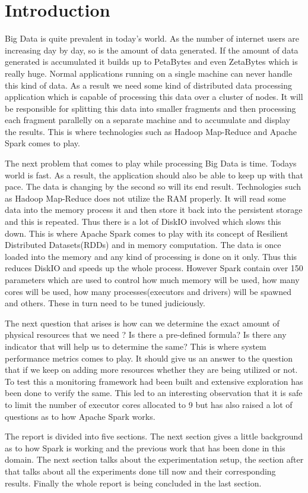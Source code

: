 \documentclass[11pt]{article}
\begin{document}
\section{Introduction}
Big Data is quite prevalent in today's world. As the number of internet users are increasing day by day, so is the amount of data generated. If the amount of data generated is accumulated it builds up to PetaBytes and even ZetaBytes which is really huge. Normal applications running on a single machine can never handle this kind of data. As a result we need some kind of distributed data processing application which is capable of processing this data over a cluster of nodes. It will be responsible for splitting this data into smaller fragments and then processing each fragment parallelly on a separate machine and to accumulate and display the results. This is where technologies such as Hadoop Map-Reduce and Apache Spark comes to play. 
\par The next problem that comes to play while processing  Big Data is time. Todays world is fast. As a result, the application should also be able to keep up with that pace. The data is changing by the second so will its end result. Technologies such as Hadoop Map-Reduce does not utilize the RAM properly. It will read some data into the memory process it and then store it back into the persistent storage and this is repeated. Thus there is a lot of DiskIO involved which slows this down. This is where Apache Spark comes to play with its concept of Resilient Distributed Datasets(RDDs) and in memory computation. The data is once loaded into the memory and any kind of processing is done on it only. Thus this reduces DiskIO and speeds up the whole process. However Spark contain over 150 parameters which are used to control how much memory will be used, how many cores will be used, how many processes(executors and drivers) will be spawned and others. These in turn need to be tuned judiciously. 
\par The next question that arises is  how can we determine the exact amount of physical resources that we need ? Is there a pre-defined formula? Is there any indicator that will help us to determine the same? This is where system performance metrics comes to play. It should give us an answer to the question that if we keep on adding more resources whether they are being utilized or not.  To test this a monitoring framework had been built and extensive exploration has been done to verify the same. This led to an interesting observation that it is safe to limit the number of executor cores allocated to 9 but has also raised a lot of questions as to how Apache Spark works.
\par The report is divided into five sections. The next section gives a little background as to how Spark is working and the previous work that has been done in this domain. The next section talks about the experimentation setup, the section after that talks about all the experiments done till now and their corresponding results. Finally the whole report is being concluded in the last section. 
\end{document}
